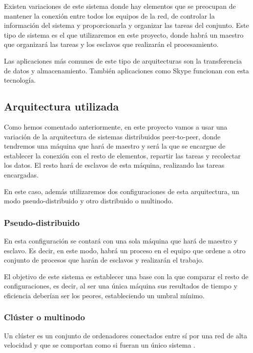 Existen variaciones de este sistema donde hay elementos que se preocupan de mantener la conexión entre todos los equipos de la red, de controlar la información del sistema y proporcionarla y organizar las tareas del conjunto. Este tipo de sistema es el que utilizaremos en este proyecto, donde habrá un maestro que organizará las tareas y los esclavos que realizarán el procesamiento.

Las aplicaciones más comunes de este tipo de arquitecturas son la transferencia de datos y almacenamiento. También aplicaciones como Skype funcionan con esta tecnología.

\subsection{Arquitectura utilizada}
Como hemos comentado anteriormente, en este proyecto vamos a usar una variación de la arquitectura de sistemas distribuidos peer-to-peer, donde tendremos una máquina que hará de maestro y será la que se encargue de establecer la conexión con el resto de elementos, repartir las tareas y recolectar los datos. El resto hará de esclavos de esta máquina, realizando las tareas encargadas.

En este caso, además utilizaremos dos configuraciones de esta arquitectura, un modo pseudo-distribuido y otro distribuido o multinodo.

\subsubsection{Pseudo-distribuido}
En esta configuración se contará con una sola máquina que hará de maestro y esclavo. Es decir, en este modo, habrá un proceso en el equipo que ordene a otro conjunto de procesos que harán de esclavos y realizarán el trabajo.

El objetivo de este sistema es establecer una base con la que comparar el resto de configuraciones, es decir, al ser una única máquina sus resultados de tiempo y eficiencia deberían ser los peores, estableciendo un umbral mínimo.

\subsubsection{Clúster o multinodo}
Un clúster es un conjunto de ordenadores conectados entre sí por una red de alta velocidad y que se comportan como si fueran un único sistema \cite{cluster}. 

